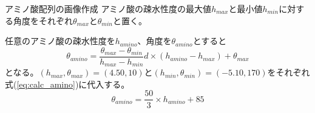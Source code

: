 \documentclass[dvipdfmx]{beamer}
\begin{document}
  \begin{frame}{アミノ酸配列の画像作成}
    アミノ酸の疎水性度の最大値\(h_{max}\)と最小値\(h_{min}\)に対する角度をそれぞれ\(\theta_{max}\)と\(\theta_{min}\)と置く。
    \begin{figure}[H]
      \centering
    \end{figure}
  \end{frame}

  \begin{frame}
    任意のアミノ酸の疎水性度を\(h_{amino}\)、角度を\(\theta_{amino}\)とすると
    \begin{equation}
      \label{eq:calc_amino}
      \theta_{amino} = \frac{\theta_{max} - \theta_{min}}{h_{max} - h_{min}} d\times (h_{amino} - h_{max}) + \theta_{max}
    \end{equation}
    となる。\((h_{max}, \theta_{max}) = (4.50, 10)\)と\((h_{min}, \theta_{min}) = (-5.10, 170)\)をそれぞれ式(\ref{eq:calc_amino})に代入する。
    \begin{equation}
      \label{eq:calc_amino_concreate}
      \theta_{amino} = \frac{50}{3} \times h_{amino} + 85
    \end{equation}
  \end{frame}
\end{document}
